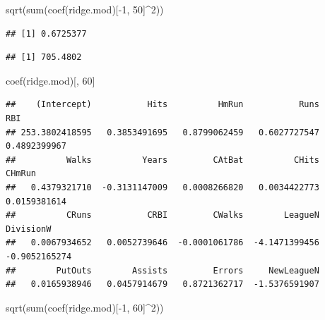 \documentclass[
  12pt,
]{book}
\newenvironment{Shaded}{\begin{snugshade}}{\end{snugshade}}
\newcommand{\DecValTok}[1]{\textcolor[rgb]{0.00,0.00,0.81}{#1}}
\newcommand{\FunctionTok}[1]{\textcolor[rgb]{0.00,0.00,0.00}{#1}}
\newcommand{\NormalTok}[1]{#1}
\newcommand{\SpecialCharTok}[1]{\textcolor[rgb]{0.00,0.00,0.00}{#1}}
\theoremstyle{definition}
\theoremstyle{definition}
\theoremstyle{definition}
\theoremstyle{definition}
\theoremstyle{remark}
\begin{document}
\begin{Shaded}
\begin{Highlighting}[]
\FunctionTok{sqrt}\NormalTok{(}\FunctionTok{sum}\NormalTok{(}\FunctionTok{coef}\NormalTok{(ridge.mod)[}\SpecialCharTok{{-}}\DecValTok{1}\NormalTok{, }\DecValTok{50}\NormalTok{]}\SpecialCharTok{\^{}}\DecValTok{2}\NormalTok{))}
\end{Highlighting}
\end{Shaded}

\begin{verbatim}
## [1] 0.6725377
\end{verbatim}

\begin{Shaded}
\end{Shaded}

\begin{verbatim}
## [1] 705.4802
\end{verbatim}

\begin{Shaded}
\begin{Highlighting}[]
\FunctionTok{coef}\NormalTok{(ridge.mod)[, }\DecValTok{60}\NormalTok{]}
\end{Highlighting}
\end{Shaded}

\begin{verbatim}
##    (Intercept)           Hits          HmRun           Runs            RBI 
## 253.3802418595   0.3853491695   0.8799062459   0.6027727547   0.4892399967 
##          Walks          Years         CAtBat          CHits         CHmRun 
##   0.4379321710  -0.3131147009   0.0008266820   0.0034422773   0.0159381614 
##          CRuns           CRBI         CWalks        LeagueN      DivisionW 
##   0.0067934652   0.0052739646  -0.0001061786  -4.1471399456  -0.9052165274 
##        PutOuts        Assists         Errors     NewLeagueN 
##   0.0165938946   0.0457914679   0.8721362717  -1.5376591907
\end{verbatim}

\begin{Shaded}
\begin{Highlighting}[]
\FunctionTok{sqrt}\NormalTok{(}\FunctionTok{sum}\NormalTok{(}\FunctionTok{coef}\NormalTok{(ridge.mod)[}\SpecialCharTok{{-}}\DecValTok{1}\NormalTok{, }\DecValTok{60}\NormalTok{]}\SpecialCharTok{\^{}}\DecValTok{2}\NormalTok{))}
\end{Highlighting}
\end{Shaded}
\end{document}
